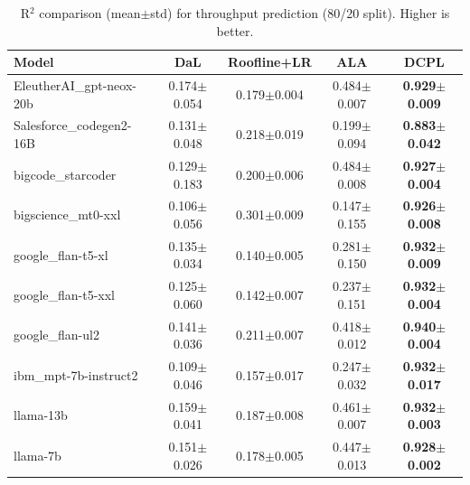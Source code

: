 \begin{table}[t]
\centering
\small
\begin{tabular}{lcccc}
\toprule
Model & DaL & Roofline+LR & ALA & DCPL \\
\midrule
EleutherAI\_gpt-neox-20b & 0.174$\pm$0.054 & 0.179$\pm$0.004 & 0.484$\pm$0.007 & \textbf{0.929$\pm$0.009} \\
Salesforce\_codegen2-16B & 0.131$\pm$0.048 & 0.218$\pm$0.019 & 0.199$\pm$0.094 & \textbf{0.883$\pm$0.042} \\
bigcode\_starcoder & 0.129$\pm$0.183 & 0.200$\pm$0.006 & 0.484$\pm$0.008 & \textbf{0.927$\pm$0.004} \\
bigscience\_mt0-xxl & 0.106$\pm$0.056 & 0.301$\pm$0.009 & 0.147$\pm$0.155 & \textbf{0.926$\pm$0.008} \\
google\_flan-t5-xl & 0.135$\pm$0.034 & 0.140$\pm$0.005 & 0.281$\pm$0.150 & \textbf{0.932$\pm$0.009} \\
google\_flan-t5-xxl & 0.125$\pm$0.060 & 0.142$\pm$0.007 & 0.237$\pm$0.151 & \textbf{0.932$\pm$0.004} \\
google\_flan-ul2 & 0.141$\pm$0.036 & 0.211$\pm$0.007 & 0.418$\pm$0.012 & \textbf{0.940$\pm$0.004} \\
ibm\_mpt-7b-instruct2 & 0.109$\pm$0.046 & 0.157$\pm$0.017 & 0.247$\pm$0.032 & \textbf{0.932$\pm$0.017} \\
llama-13b & 0.159$\pm$0.041 & 0.187$\pm$0.008 & 0.461$\pm$0.007 & \textbf{0.932$\pm$0.003} \\
llama-7b & 0.151$\pm$0.026 & 0.178$\pm$0.005 & 0.447$\pm$0.013 & \textbf{0.928$\pm$0.002} \\
\bottomrule
\end{tabular}

\caption{R$^2$ comparison (mean$\pm$std) for throughput prediction (80/20 split). Higher is better.}
\label{tab:r2_dal_roofline_ala_dcpl}
\end{table}
